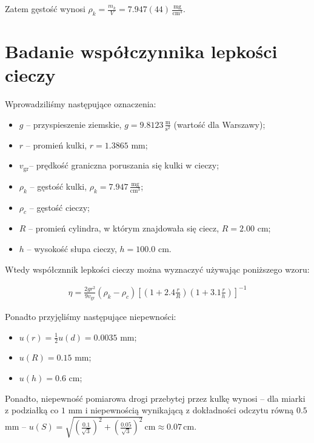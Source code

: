 \documentclass[a4paper]{article}
\begin{document}
Zatem gęstość wynosi $\rho_k = \frac{m_k}{V} = 7.947 (44) \, \frac{\text{mg}}{\text{cm}^3}$.

\section{Badanie współczynnika lepkości cieczy}

\newcommand{\vgr}{\ensuremath{v_{\text{gr}}}}

Wprowadziliśmy następujące oznaczenia:

\begin{itemize}
	\item $g$ -- przyspieszenie ziemskie, $g = 9.8123 \, \frac{\text{m}}{\text{s}^2}$ (wartość dla Warszawy);
	\item $r$ -- promień kulki, $r = 1.3865$ mm;
	\item \vgr -- prędkość graniczna poruszania się kulki w cieczy;
	\item $\rho_k$ -- gęstość kulki, $\rho_k = 7.947 \, \frac{\text{mg}}{\text{cm}^3}$;
	\item $\rho_c$ -- gęstość cieczy;
	\item $R$ -- promień cylindra, w którym znajdowała się ciecz, $R = 2.00$ cm;
	\item $h$ -- wysokość słupa cieczy, $h = 100.0$ cm.
\end{itemize}

Wtedy współcznnik lepkości cieczy można wyznaczyć używając poniższego wzoru:

\begin{align}
\eta = \frac{2 g r^2}{9 v_{\text{gr}}}(\rho_k - \rho_c)\left[(1 + 2.4 \frac r R)(1 + 3.1 \frac r h)\right]^{-1} \label{eq_lepkosc}
\end{align}

Ponadto przyjęliśmy następujące niepewności:

\begin{itemize}
	\item $u(r) = \frac 1 2 u(d) = 0.0035$ mm;
	\item $u(R) = 0.15$ mm; %
	\item $u(h) = 0.6$ cm;
\end{itemize}

Ponadto, niepewność pomiarowa drogi przebytej przez kulkę wynosi
-- dla miarki z podziałką co $1$ mm i niepewnością wynikającą z dokładności odczytu równą $0.5$ mm --
$u(S) = \sqrt{(\frac{0.1}{\sqrt 3})^2 + (\frac{0.05}{\sqrt 3})^2} \, \text{cm}
\approx 0.07 \, \text{cm}$.
\end{document}
